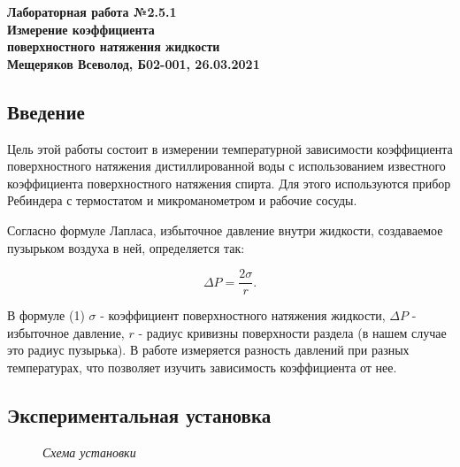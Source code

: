 \documentclass[a4paper, fontsize = 14pt]{article}
\begin{document}
\begin{center} \textbf{
Лабораторная работа №2.5.1 \\ Измерение коэффициента \\ поверхностного натяжения жидкости\\
Мещеряков Всеволод, Б02-001, 26.03.2021}
\end{center} 

\subsection*{Введение}

Цель этой работы состоит в измерении температурной зависимости коэффициента поверхностного натяжения дистиллированной воды с использованием известного коэффициента поверхностного натяжения спирта. Для этого используются прибор Ребиндера с термостатом и микроманометром и рабочие сосуды.

Согласно формуле Лапласа, избыточное давление внутри жидкости, создаваемое пузырьком воздуха в ней, определяется так:

\begin{equation}
	\Delta P = \frac{2\sigma}{r}.
\end{equation}

В формуле (1) $\sigma$ - коэффициент поверхностного натяжения жидкости, $\Delta P$ - избыточное давление, $r$ - радиус кривизны поверхности раздела (в нашем случае это радиус пузырька). В работе измеряется разность давлений при разных температурах, что позволяет изучить зависимость коэффициента от нее.

\subsection*{Экспериментальная установка}

\begin{figure}[hbt]\label{risI}
\caption{\textit{Схема установки}}
\end{figure}
\end{document}
